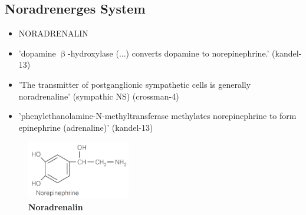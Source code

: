 \documentclass[12pt,a4paper,pdftex]{article}
\begin{document}
\subsection{Noradrenerges System}
\label{noradrenerges_system}

\begin{itemize}
    \item NORADRENALIN
    \item 'dopamine $\upbeta$-hydroxylase (...) converts dopamine to norepinephrine.' (kandel-13)
    \item 'The transmitter of postganglionic sympathetic cells is generally noradrenaline' (sympathic NS) (crossman-4)
    \item 'phenylethanolamine-N-methyltransferase methylates norepinephrine to form epinephrine (adrenaline)' (kandel-13)
\end{itemize}{}

\begin{figure}
    \centering
    \includegraphics[width=0.4\textwidth]{pictures/Bilder_monoamine_systeme/noradrenalin.PNG}
    \caption{\textbf{Noradrenalin}}
    \label{fig:noradrenalin}
\end{figure}{}
\end{document}
